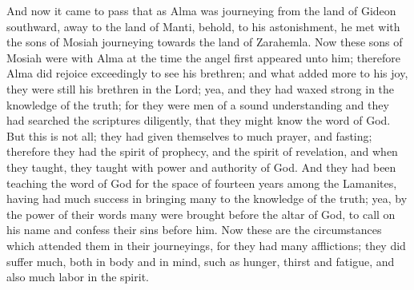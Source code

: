 And now it came to pass that as Alma was journeying from the land of Gideon southward, away to the land of Manti, behold, to his astonishment, he met with the sons of Mosiah journeying towards the land of Zarahemla.
\bverse \iffalse Now these sons of Mosiah were with Alma at the time the angel first appeared unto him; therefore Alma did rejoice exceedingly to see his brethren; and what added more to his joy, they were still his brethren in the Lord; yea, and they had waxed strong in the knowledge of the truth; for they were men of a sound understanding and they had searched the scriptures diligently, that they might know the word of God. \fi
Now these sons of Mosiah were with Alma at the time the angel first appeared unto him; therefore Alma did rejoice exceedingly to see his brethren; and what added more to his joy, they were still his brethren in the Lord; yea, and they had waxed strong in the knowledge of the truth; for they were men of a sound understanding and they had searched the scriptures diligently, that they might know the word of God.
\bverse \iffalse But this is not all; they had given themselves to much prayer, and fasting; therefore they had the spirit of prophecy, and the spirit of revelation, and when they taught, they taught with power and authority of God. \fi
But this is not all; they had given themselves to much prayer, and fasting; therefore they had the spirit of prophecy, and the spirit of revelation, and when they taught, they taught with power and authority of God.
\bverse \iffalse And they had been teaching the word of God for the space of fourteen years among the Lamanites, having had much success in bringing many to the knowledge of the truth; yea, by the power of their words many were brought before the altar of God, to call on his name and confess their sins before him. \fi
And they had been teaching the word of God for the space of fourteen years among the Lamanites, having had much success in bringing many to the knowledge of the truth; yea, by the power of their words many were brought before the altar of God, to call on his name and confess their sins before him.
\bverse \iffalse Now these are the circumstances which attended them in their journeyings, for they had many afflictions; they did suffer much, both in body and in mind, such as hunger, thirst and fatigue, and also much labor in the spirit. \fi
Now these are the circumstances which attended them in their journeyings, for they had many afflictions; they did suffer much, both in body and in mind, such as hunger, thirst and fatigue, and also much labor in the spirit.
